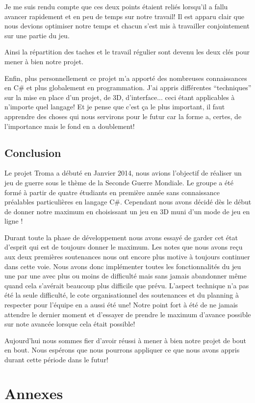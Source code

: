 \documentclass[11pt]{report}
\begin{document}
Je me suis rendu compte que ces deux points étaient reliés lorsqu'il a fallu avancer rapidement et en peu de temps sur notre travail! Il est apparu clair que nous devions optimiser notre temps et chacun s'est mis à travailler conjointement sur une partie du jeu.

Ainsi la répartition des taches et le travail régulier sont devenu les deux clés pour mener à bien notre projet.

Enfin, plus personnellement ce projet m'a apporté des nombreuses connaissances en C\# et plus globalement en programmation. J'ai appris différentes ``techniques''  sur la mise en place d'un projet, de 3D, d'interface... ceci étant applicables à n'importe quel langage! Et je pense que c'est ça le plus important, il faut apprendre des choses qui nous servirons pour le futur car la forme a, certes, de l'importance mais le fond en a doublement!

\chapter*{Conclusion}

Le projet Troma a débuté en Janvier 2014, nous avions l'objectif de réaliser un jeu de guerre sous le thème de la Seconde Guerre Mondiale. Le groupe a été formé à partir de quatre étudiants en première année sans connaissance préalables particulières en langage C\#. Cependant nous avons décidé dès le début de donner notre maximum en choisissant un jeu en 3D muni d'un mode de jeu en ligne ! 

Durant toute la phase de développement nous avons essayé de garder cet état d'esprit qui est de toujours donner le maximum. Les notes que nous avons reçu aux deux premières soutenances nous ont encore plus motive à toujours continuer dans cette voie. Nous avons donc implémenter toutes les fonctionnalités du jeu une par une avec plus ou moins de difficulté mais sans jamais abandonner même quand cela s’avérait beaucoup plus difficile que prévu. L'aspect technique n'a pas été la seule difficulté, le cote organisationnel des soutenances et du planning à respecter pour l'équipe en a aussi été une! Notre point fort à été de ne jamais attendre le dernier moment et d'essayer de prendre le maximum d'avance possible sur note avancée lorsque cela était possible!

Aujourd'hui nous sommes fier d'avoir réussi à mener à bien notre projet de bout en bout. Nous espérons que nous pourrons appliquer ce que nous avons appris durant cette période dans le futur!

\newpage
{}
\part*{Annexes}

\newpage
\listoffigures

\newpage
\tableofcontents
 
\end{document}
